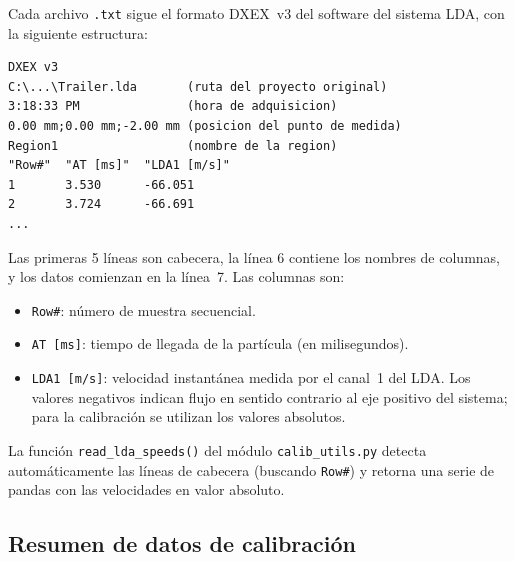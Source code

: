 \documentclass[12pt,a4paper]{article}
\begin{document}
Cada archivo \texttt{.txt} sigue el formato DXEX~v3 del software del sistema
LDA, con la siguiente estructura:

\begin{lstlisting}[caption={Estructura de un archivo de datos LDA (DXEX~v3).},
                   language={}]
DXEX v3
C:\...\Trailer.lda       (ruta del proyecto original)
3:18:33 PM               (hora de adquisicion)
0.00 mm;0.00 mm;-2.00 mm (posicion del punto de medida)
Region1                  (nombre de la region)
"Row#"  "AT [ms]"  "LDA1 [m/s]"
1       3.530      -66.051
2       3.724      -66.691
...
\end{lstlisting}

Las primeras 5 líneas son cabecera, la línea 6 contiene los nombres de
columnas, y los datos comienzan en la línea~7.  Las columnas son:
\begin{itemize}
	\item \texttt{Row\#}: número de muestra secuencial.
	\item \texttt{AT [ms]}: tiempo de llegada de la partícula (en milisegundos).
	\item \texttt{LDA1 [m/s]}: velocidad instantánea medida por el canal~1 del
	      LDA. Los valores negativos indican flujo en sentido contrario al eje
	      positivo del sistema; para la calibración se utilizan los valores
	      absolutos.
\end{itemize}

La función \texttt{read\_lda\_speeds()} del módulo \texttt{calib\_utils.py}
detecta automáticamente las líneas de cabecera (buscando \texttt{Row\#}) y
retorna una serie de pandas con las velocidades en valor absoluto.

\subsection{Resumen de datos de calibración}
\end{document}
